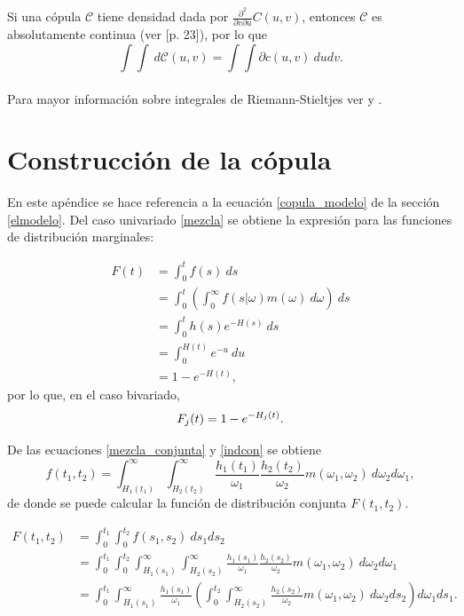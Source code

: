 \documentclass[11pt,a4paper]{article}
\begin{document}
\begin{appendices}
Si una cópula $\mathcal{C}$ tiene densidad dada por $\frac{\partial ^2}{\partial v \partial u} C(u, v)$, entonces $\mathcal{C}$ es absolutamente continua (ver \citet{nelsen}[p. 23]), por lo que $$\int\int \ d\mathcal{C}(u,v) = \int\int \partial c(u, v) \ dudv.$$\\

Para mayor información sobre integrales de Riemann-Stieltjes ver \citet{rudin} y \citet{bartle}.

\newpage

\section{Construcción de la cópula} \label{construccion_copula}

En este apéndice se hace referencia a la ecuación \eqref{copula_modelo} de la sección \ref{elmodelo}. Del caso univariado \eqref{mezcla} se obtiene la expresión para las funciones de distribución marginales:

\begin{align*}
F(t) &= \int_0^t f(s) \ ds\\
&= \int_0^t\left(\int_0^\infty f(s|\omega)m(\omega) \ d\omega \right) \ ds\\
&= \int_0^t h(s)e^{-H(s)} \ ds\\
&= \int_0^{H(t)} e^{-u} \ du\\
&= 1-e^{-H(t)},
\end{align*}
por lo que, en el caso bivariado,
\begin{equation}\label{dist_marginal}
F_j(t) = 1-e^{-H_j(t)}.\\
\end{equation}

De las ecuaciones \eqref{mezcla_conjunta} y \eqref{indcon} se obtiene $$f(t_1, t_2) = \int_{H_1(t_1)}^\infty \int_{H_2(t_2)}^\infty \frac{h_1(t_1)}{\omega_1}\frac{h_2(t_2)}{\omega_2}m(\omega_1, \omega_2) \ d\omega_2 d\omega_1,$$ de donde se puede calcular la función de distribución conjunta $F(t_1, t_2)$.

\begin{align*}
F(t_1, t_2) &= \int_0^{t_1} \int_0^{t_2} f(s_1, s_2) \ ds_1 ds_2\\
&= \int_0^{t_1} \int_0^{t_2}\int_{H_1(s_1)}^\infty \int_{H_2(s_2)}^\infty \frac{h_1(s_1)}{\omega_1}\frac{h_2(s_2)}{\omega_2}m(\omega_1, \omega_2) \ d\omega_2 d\omega_1\\
&= \int_0^{t_1}\int_{H_1(s_1)}^\infty \frac{h_1(s_1)}{\omega_1}\left(\int_0^{t_2} \int_{H_2(s_2)}^\infty \frac{h_2(s_2)}{\omega_2} m(\omega_1, \omega_2) \ d\omega_2 ds_2 \right) d\omega_1 ds_1.
\end{align*}


\end{appendices}
\end{document}
